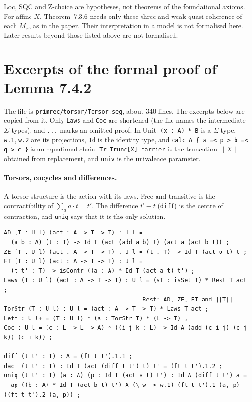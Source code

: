 \documentclass[11pt]{article}
\newcommand{\sys}{\textsf{Unit}\xspace}
\newcommand{\tr}[1]{\lVert #1\rVert}
\theoremstyle{remark}
\begin{document}
Loc, SQC and Z-choice are hypotheses, not theorems of the foundational
axioms. For affine $X$, Theorem~7.3.6 needs only these three and weak
quasi-coherence of each $M_x$, as in the paper.
Their interpretation in a model is not formalised here.
Later results beyond those listed above are not formalised.


\appendix
\section{Excerpts of the formal proof of Lemma 7.4.2}\label{app:torsor}

The file is \texttt{primrec/torsor/Torsor.seg}, about 340 lines. The
excerpts below are copied from it. Only \verb|Laws| and \verb|Coc| are
shortened (the file names the intermediate $\Sigma$-types), and
\verb|...| marks an omitted proof. In \sys, \verb|(x : A) * B| is a
$\Sigma$-type, \verb|w.1|, \verb|w.2| are its projections, \verb|Id|
is the identity type, and \verb|calc A { a =< p > b =< q > c }| is an
equational chain. \verb|Tr.Trunc[X].carrier| is the truncation
$\tr{X}$ obtained from replacement, and \verb|univ| is the univalence
parameter.

\paragraph{Torsors, cocycles and differences.} A torsor structure is the
action with its laws. Free and transitive is the contractibility of
$\sum_a a\cdot t=t'$. The difference $t'-t$ (\verb|diff|) is the centre
of contraction, and \verb|uniq| says that it is the only solution.
{\footnotesize
\begin{verbatim}
AD (T : U l) (act : A -> T -> T) : U l =
  (a b : A) (t : T) -> Id T (act (add a b) t) (act a (act b t)) ;
ZE (T : U l) (act : A -> T -> T) : U l = (t : T) -> Id T (act o t) t ;
FT (T : U l) (act : A -> T -> T) : U l =
  (t t' : T) -> isContr ((a : A) * Id T (act a t) t') ;
Laws (T : U l) (act : A -> T -> T) : U l = (sT : isSet T) * Rest T act ;
                                     -- Rest: AD, ZE, FT and ||T||
TorStr (T : U l) : U l = (act : A -> T -> T) * Laws T act ;
Left : U l+ = (T : U l) * (s : TorStr T) * (L -> T) ;
Coc : U l = (c : L -> L -> A) * ((i j k : L) -> Id A (add (c i j) (c j k)) (c i k)) ;

diff (t t' : T) : A = (ft t t').1.1 ;
dact (t t' : T) : Id T (act (diff t t') t) t' = (ft t t').1.2 ;
uniq (t t' : T) (a : A) (p : Id T (act a t) t') : Id A (diff t t') a =
  ap ((b : A) * Id T (act b t) t') A (\ w -> w.1) (ft t t').1 (a, p) ((ft t t').2 (a, p)) ;
\end{verbatim}}
\end{document}
